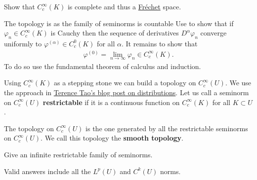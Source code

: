 \documentclass[
    a4paper,
    DIV=14,
    abstract=true,
    numbers=noenddot
]{scrartcl}
\begin{document}
\begin{exercise}
	Show that $C_c^\infty(K)$ is complete and thus a \href{https://en.wikipedia.org/wiki/Fr%C3%A9chet_space#:~:text=locally%20convex%20metrizable%20topological%20vector%20space}{Fréchet} space.
\end{exercise}
\begin{hint}
	The topology is  as the family of seminorms is countable
	Use   to show that if $\varphi_n \in C_c^\infty(K)$ is Cauchy then the sequence of derivatives $D^\alpha \varphi_n $ converge uniformly to $\varphi^{(\alpha)} \in C_c^0(K)$ for all $\alpha$. It remains to show that
	\begin{align*}
		\varphi^{(0)}= \lim_{n \to \infty} \varphi_n \in  C_c^\infty(K).
	\end{align*}
	To do so use the fundamental theorem of calculus and induction.
\end{hint}
Using $C_c^\infty(K)$ as a stepping stone we can build a topology on $C_c^\infty(U)$. We use the approach in \href{https://terrytao.wordpress.com/2009/04/19/245c-notes-3-distributions/#:~:text=is%20clearly%20a-,vector,-space.%20Now%20we}{Terence Tao's blog post on distributions}. Let us call a seminorm on $C_c^\infty(U)$ \textbf{restrictable} if it is a continuous function on $C_c^\infty(K)$ for all $K \subset U$.     \begin{definition}        The topology on $C_c^\infty(U)$ is the one generated by all the restrictable seminorms on $C_c^\infty(U)$. We call this topology the \textbf{smooth topology}.
\end{definition}
\begin{exercise}
	Give an infinite restrictable family of seminorms.
\end{exercise}
\begin{hint}
	Valid answers include all the $L^p(U)$ and $C^k(U)$ norms.
\end{hint}
\end{document}
